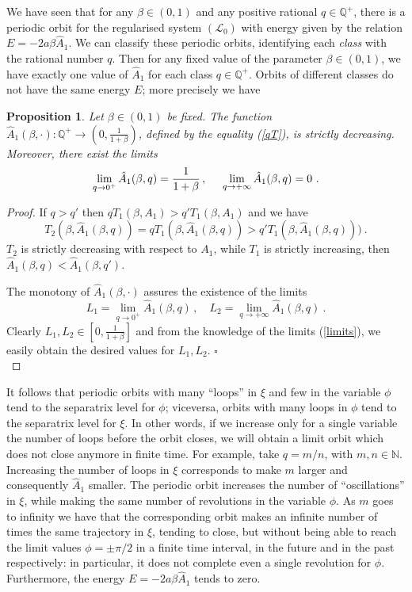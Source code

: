\documentclass[a4paper]{article}
\newtheorem{proposition}{Proposition}
\begin{document}
We have seen that for any $\beta \in (0,1)$ and any positive rational
$q \in {\mathbb{Q}}^+$, there is a periodic orbit for the regularised system
$(\mathcal{L}_0)$ with energy given by the relation $E=-2a \beta
\hat{A}_1$.  We can classify these periodic orbits, identifying each
\emph{class} with the rational number $q$. Then for any fixed value of
the parameter $\beta \in (0,1)$, we have exactly one value of
$\hat{A}_1$ for each class $q \in {\mathbb{Q}}^+$. Orbits of different classes
do not have the same energy $E$; more precisely we have
\begin{proposition}
  \label{A1_respect_q}
  Let $\beta \in (0,1)$ be fixed. The function 
  $\hat{A}_1(\beta, \cdot): {\mathbb{Q}}^+ \rightarrow (0,\frac{1}{1+\beta})$, 
  defined by the equality (\ref{qT}), is strictly decreasing. 
  Moreover, there exist the limits
  \[
  \lim_{q \rightarrow 0^+}\hat{A}_1(\beta,q)=\frac{1}{1+\beta}
  \,, \hskip 0.5cm
  \lim_{q \rightarrow +\infty}\hat{A}_1(\beta,q)=0
  \ .
  \]
\end{proposition}
\begin{proof}
  If $q>q'$ then $qT_1(\beta,A_1)>q'T_1(\beta,A_1)$ and we have 
  \[
  T_2(\beta, \hat{A}_1(\beta,q))=qT_1(\beta, \hat{A}_1(\beta,q))
  >q'T_1(\beta,\hat{A}_1(\beta,q)))\ .
  \] 
  $T_2$ is strictly decreasing with respect to $A_1$, while $T_1$ is
  strictly increasing, then $\hat{A}_1(\beta,q)<\hat{A}_1(\beta,q')$.
  
  The monotony of $\hat{A}_1(\beta,\cdot)$ assures the existence of the limits
  \[
  L_1=\lim_{q \rightarrow 0^+}\hat{A}_1(\beta,q)\,, \quad
  L_2=\lim_{q \rightarrow +\infty}\hat{A}_1(\beta,q)\ .
  \]
  Clearly $L_1,L_2 \in \left[0,\frac{1}{1+\beta}\right]$ and from the knowledge 
  of the limits (\ref{limits}), we easily obtain the desired values for 
  $L_1,L_2$.
{$\square$\\}
\end{proof}
  

It follows that periodic orbits with many ``loops'' in $\xi$ and few
in the variable $\phi$ tend to the separatrix level for $\phi$;
viceversa, orbits with many loops in $\phi$ tend to the separatrix
level for $\xi$.  In other words, if we increase only for a single
variable the number of loops before the orbit closes, we will obtain a
limit orbit which does not close anymore in finite time.  For example,
take $q=m/n$, with $m,n \in {\mathbb{N}}$. Increasing the number of loops in
$\xi$ corresponds to make $m$ larger and consequently $\hat{A}_1$
smaller.  The periodic orbit increases the number of ``oscillations''
in $\xi$, while making the same number of revolutions in the variable
$\phi$.  As $m$ goes to infinity we have that the corresponding orbit
makes an infinite number of times the same trajectory in $\xi$,
tending to close, but without being able to reach the limit values
$\phi=\pm \pi/2$ in a finite time interval, in the future and in the
past respectively: in particular, it does not complete even a single
revolution for $\phi$.  Furthermore, the energy $E=-2a \beta
\hat{A}_1$ tends to zero.
\end{document}
